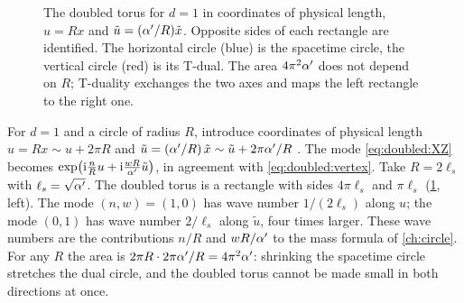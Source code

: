 \begin{figure}[ht]
\centering
{}
\caption{The doubled torus for $d=1$ in coordinates of physical length, $u=Rx$ and
$\tilde u=(\alpha'/R)\tilde x$. Opposite sides of each rectangle are identified. The horizontal
circle (blue) is the spacetime circle, the vertical circle (red) is its T-dual. The area
$4\pi^2\alpha'$ does not depend on $R$; T-duality exchanges the two axes and maps the left
rectangle to the right one.}\label{fig:doubled:torus}
\end{figure}

\begin{example}\label{ex:doubled:circle}
For $d=1$ and a circle of radius $R$, introduce coordinates of physical length
$u=Rx\sim u+2\pi R$ and $\tilde u=(\alpha'/R)\,\tilde x\sim\tilde u+2\pi\alpha'/R$
. The mode \eqref{eq:doubled:XZ} becomes
$\exp\bigl(\mathrm{i}\frac nR u+\mathrm{i}\frac{wR}{\alpha'}\tilde u\bigr)$, in agreement with
\eqref{eq:doubled:vertex}. Take $R=2\ell_s$ with $\ell_s=\sqrt{\alpha'}$. The doubled torus is a
rectangle with sides $4\pi\ell_s$ and $\pi\ell_s$ (\cref{fig:doubled:torus}, left). The mode
$(n,w)=(1,0)$ has wave number $1/(2\ell_s)$ along $u$; the mode $(0,1)$ has wave number
$2/\ell_s$ along $\tilde u$, four times larger. These wave numbers are the contributions
$n/R$ and $wR/\alpha'$ to the mass formula of \cref{ch:circle}. For any $R$ the area is
$2\pi R\cdot2\pi\alpha'/R=4\pi^2\alpha'$: shrinking the spacetime circle stretches the dual circle, and
the doubled torus cannot be made small in both directions at once.
\end{example}

